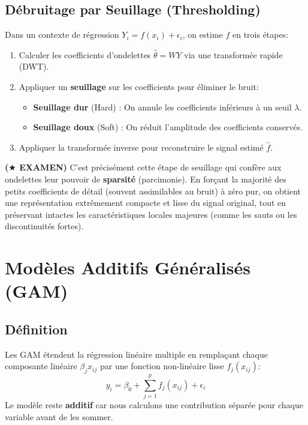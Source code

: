 \subsection{Débruitage par Seuillage (Thresholding)}
Dans un contexte de régression $Y_i = f(x_i) + \epsilon_i$, on estime $f$ en trois étapes:
\begin{enumerate}
    \item Calculer les coefficients d'ondelettes $\hat{\theta} = WY$ via une transformée rapide (DWT).
    \item Appliquer un \textbf{seuillage} sur les coefficients pour éliminer le bruit:
    \begin{itemize}
        \item \textbf{Seuillage dur} (Hard) : On annule les coefficients inférieurs à un seuil $\lambda$.
        \item \textbf{Seuillage doux} (Soft) : On réduit l'amplitude des coefficients conservés.
    \end{itemize}
    \item Appliquer la transformée inverse pour reconstruire le signal estimé $\hat{f}$.
\end{enumerate}
\textbf{($\bigstar$ EXAMEN)} C'est précisément cette étape de seuillage qui confère aux ondelettes leur pouvoir de \textbf{sparsité} (parcimonie). En forçant la majorité des petits coefficients de détail (souvent assimilables au bruit) à zéro pur, on obtient une représentation extrêmement compacte et lisse du signal original, tout en préservant intactes les caractéristiques locales majeures (comme les sauts ou les discontinuités fortes).

\section{Modèles Additifs Généralisés (GAM)}

\subsection{Définition}
Les GAM étendent la régression linéaire multiple en remplaçant chaque composante linéaire $\beta_j x_{ij}$ par une fonction non-linéaire lisse $f_j(x_{ij})$:
\begin{equation}
    y_i = \beta_0 + \sum_{j=1}^{p} f_j(x_{ij}) + \epsilon_i
\end{equation}
Le modèle reste \textbf{additif} car nous calculons une contribution séparée pour chaque variable avant de les sommer.

